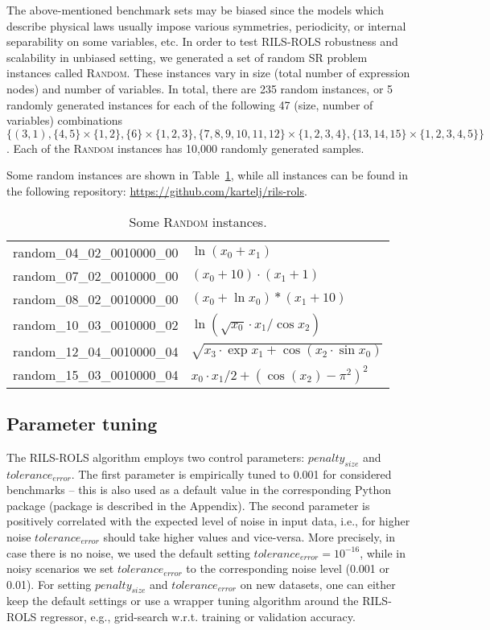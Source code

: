\documentclass{bmcart}
\begin{document}
The above-mentioned benchmark sets may be biased since the models which describe physical laws usually impose various symmetries, periodicity, or internal separability on some variables, etc. In order to test \textsc{RILS-ROLS} robustness and scalability in unbiased setting, we generated a set of random SR problem instances called \textsc{Random}. These instances vary in size (total number of expression nodes) and number of variables. In total, there are 235 random instances, or 5 randomly generated instances for each of the following 47 (size, number of variables) combinations $\{(3, 1), \{4, 5\} \times \{1, 2\}, \{6\} \times \{1, 2, 3\}, \{7, 8, 9, 10, 11, 12\} \times \{1, 2, 3, 4\}, \{13, 14, 15\} \times \{1, 2, 3, 4, 5\}\}$. Each of the \textsc{Random} instances has 10,000 randomly generated samples. 

Some random instances are shown in Table~\ref{table:random}, while all instances can be found in %
 the following repository: \url{https://github.com/kartelj/rils-rols}.  

\begin{table}
	\caption{Some \textsc{Random} instances.}
	\label{table:random}
	\centering
	\begin{tabular}{ll} \\ \hline
		random\_04\_02\_0010000\_00 &	$\ln{(x_0 + x_1)}$\\
		random\_07\_02\_0010000\_00 &	$(x_0 + 10)\cdot (x_1 + 1)$\\
		random\_08\_02\_0010000\_00 &	$(x_0 + \ln{x_0})*(x_1 + 10)$\\
		random\_10\_03\_0010000\_02 &	$\ln{(\sqrt{x_0} \cdot x_1/\cos{x_2})}$\\
		random\_12\_04\_0010000\_04 &	$\sqrt{x_3 \cdot \exp{x_1} + \cos{(x_2 \cdot \sin{x_0})}}$\\
		random\_15\_03\_0010000\_04	&   $x_0 \cdot x_1/2 + (\cos{(x_2)} - \pi^2)^2$\\
		\hline
	\end{tabular}
\end{table}

\subsection{Parameter tuning}

The \textsc{RILS}-\textsc{ROLS} algorithm employs two control parameters: $penalty_{size}$ and $tolerance_{error}$. The first parameter is empirically tuned to 0.001 for considered benchmarks -- this is also used as a default value in the corresponding Python package (package is described in the Appendix). The second parameter is positively correlated with the expected level of noise in input data, i.e., for higher noise $tolerance_{error}$ should take higher values and vice-versa. More precisely, in case there is no noise, we used the default setting $tolerance_{error}=10^{-16}$, while in noisy scenarios we set $tolerance_{error}$ to the corresponding noise level (0.001 or 0.01). 
For setting $penalty_{size}$ and $tolerance_{error}$ on new datasets, one can either keep the default settings or use a wrapper tuning algorithm around the \textsc{RILS-ROLS} regressor, e.g., grid-search w.r.t. training or validation accuracy. 
\end{document}
